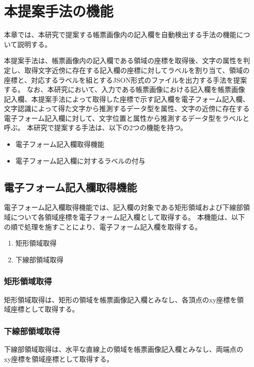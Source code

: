 \chapter{本提案手法の機能}\label{cha:Function}
本章では、本研究で提案する帳票画像内の記入欄を自動検出する手法の機能について説明する。

本提案手法は、帳票画像内の記入欄である領域の座標を取得後、文字の属性を判定し、取得文字近傍に存在する記入欄の座標に対してラベルを割り当て、領域の座標と、対応するラベルを組とするJSON形式のファイルを出力する手法を提案する。
なお、本研究において、入力である帳票画像における記入欄を帳票画像記入欄、本提案手法によって取得した座標で示す記入欄を電子フォーム記入欄、文字認識によって得た文字から推測するデータ型を属性、文字の近傍に存在する電子フォーム記入欄に対して、文字位置と属性から推測するデータ型をラベルと呼ぶ。
本研究で提案する手法は、以下の2つの機能を持つ。

\begin{itemize}
  \item 電子フォーム記入欄取得機能
  \item 電子フォーム記入欄に対するラベルの付与
\end{itemize}


\section{電子フォーム記入欄取得機能}\label{sec:eform_write_space_obtainment_feature}
電子フォーム記入欄取得機能では、記入欄の対象である矩形領域および下線部領域について各領域座標を電子フォーム記入欄として取得する。
本機能は、以下の順で処理を施すことにより、電子フォーム記入欄を取得する。

\begin{enumerate}
  \item 矩形領域取得
  \item 下線部領域取得
\end{enumerate}

\subsection{矩形領域取得}\label{subsec:rect_coords_obtainment}
矩形領域取得は、矩形の領域を帳票画像記入欄とみなし、各頂点のxy座標を領域座標として取得する。

\subsection{下線部領域取得}\label{subsec:underline_coords_obtainment}
下線部領域取得は、水平な直線上の領域を帳票画像記入欄とみなし、両端点のxy座標を領域座標として取得する。


